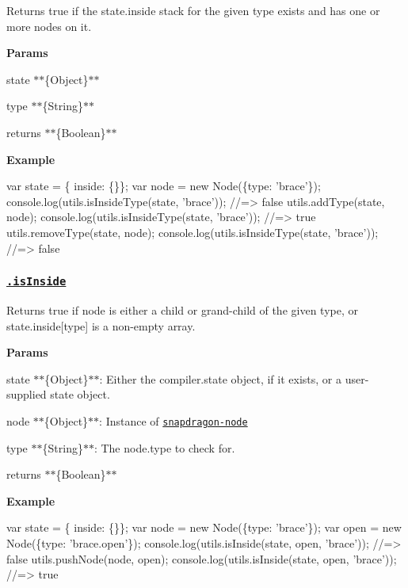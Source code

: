 Returns true if the {\ttfamily state.\+inside} stack for the given type exists and has one or more nodes on it.

{\bfseries Params}


\begin{DoxyItemize}
\item {\ttfamily state} $\ast$$\ast$\{Object\}$\ast$$\ast$
\item {\ttfamily type} $\ast$$\ast$\{String\}$\ast$$\ast$
\item {\ttfamily returns} $\ast$$\ast$\{Boolean\}$\ast$$\ast$
\end{DoxyItemize}

{\bfseries Example}


\begin{DoxyCode}
var state = \{ inside: \{\}\};
var node = new Node(\{type: 'brace'\});
console.log(utils.isInsideType(state, 'brace')); //=> false
utils.addType(state, node);
console.log(utils.isInsideType(state, 'brace')); //=> true
utils.removeType(state, node);
console.log(utils.isInsideType(state, 'brace')); //=> false
\end{DoxyCode}


\subsubsection*{\href{index.js#L867}{\tt .is\+Inside}}

Returns true if {\ttfamily node} is either a child or grand-\/child of the given {\ttfamily type}, or {\ttfamily state.\+inside\mbox{[}type\mbox{]}} is a non-\/empty array.

{\bfseries Params}


\begin{DoxyItemize}
\item {\ttfamily state} $\ast$$\ast$\{Object\}$\ast$$\ast$\+: Either the {\ttfamily compiler.\+state} object, if it exists, or a user-\/supplied state object.
\item {\ttfamily node} $\ast$$\ast$\{Object\}$\ast$$\ast$\+: Instance of \href{https://github.com/jonschlinkert/snapdragon-node}{\tt snapdragon-\/node}
\item {\ttfamily type} $\ast$$\ast$\{String\}$\ast$$\ast$\+: The {\ttfamily node.\+type} to check for.
\item {\ttfamily returns} $\ast$$\ast$\{Boolean\}$\ast$$\ast$
\end{DoxyItemize}

{\bfseries Example}


\begin{DoxyCode}
var state = \{ inside: \{\}\};
var node = new Node(\{type: 'brace'\});
var open = new Node(\{type: 'brace.open'\});
console.log(utils.isInside(state, open, 'brace')); //=> false
utils.pushNode(node, open);
console.log(utils.isInside(state, open, 'brace')); //=> true
\end{DoxyCode}


